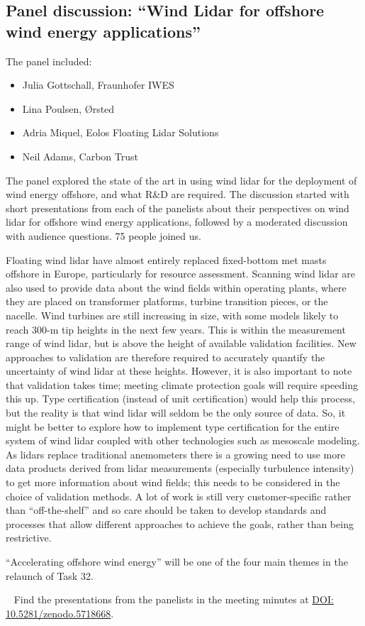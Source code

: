 \subsection{Panel discussion: “Wind Lidar for offshore wind energy applications”}

The panel included:
\begin{itemize}
        \item Julia Gottschall, Fraunhofer IWES
        \item Lina Poulsen, \O rsted
        \item Adria Miquel, Eolos Floating Lidar Solutions
        \item Neil Adams, Carbon Trust
    \end{itemize}

The panel explored the state of the art in using wind lidar for the deployment of wind energy offshore, and what R\&D are required. The discussion started with short presentations from each of the panelists about their perspectives on wind lidar for offshore wind energy applications, followed by a moderated discussion with audience questions. 75 people joined us.

Floating wind lidar have almost entirely replaced fixed-bottom met masts offshore in Europe, particularly for resource assessment. Scanning wind lidar are also used to provide data about the wind fields within operating plants, where they are placed on transformer platforms, turbine transition pieces, or the nacelle. Wind turbines are still increasing in size, with some models likely to reach 300-m tip heights in the next few years. This is within the measurement range of wind lidar, but is above the height of available validation facilities. New approaches to validation are therefore required to accurately quantify the uncertainty of wind lidar at these heights. However, it is also important to note that validation takes time; meeting climate protection goals will require speeding this up. Type certification (instead of unit certification) would help this process, but the reality is that wind lidar will seldom be the only source of data. So, it might be better to explore how to implement type certification for the entire system of wind lidar coupled with other technologies such as mesoscale modeling. As lidars replace traditional anemometers there is a growing need to use more data products derived from lidar measurements (especially turbulence intensity) to get more information about wind fields; this needs to be considered in the choice of validation methods. A lot of work is still very customer-specific rather than “off-the-shelf” and so care should be taken to develop standards and processes that allow different approaches to achieve the goals, rather than being restrictive.

\begin{taskactions}
``Accelerating offshore wind energy'' will be one of the four main themes in the relaunch of Task 32.
\end{taskactions}

\faFilePowerpointO ~ Find the presentations from the panelists in the meeting minutes at \href{https://doi.org/10.5281/zenodo.5718668}{DOI: 10.5281/zenodo.5718668}.

